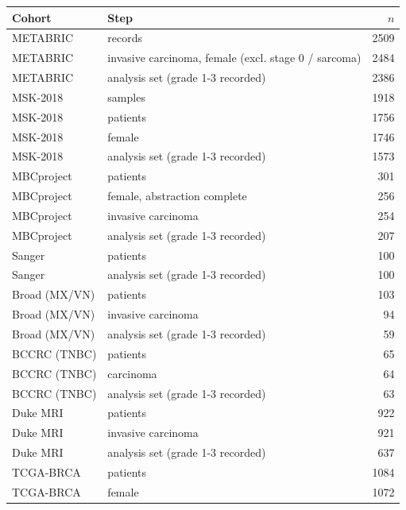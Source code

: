 \begin{tabular}{llr}
\toprule
Cohort & Step & $n$ \\
\midrule
METABRIC & records & 2509 \\
METABRIC & invasive carcinoma, female (excl. stage 0 / sarcoma) & 2484 \\
METABRIC & analysis set (grade 1-3 recorded) & 2386 \\
MSK-2018 & samples & 1918 \\
MSK-2018 & patients & 1756 \\
MSK-2018 & female & 1746 \\
MSK-2018 & analysis set (grade 1-3 recorded) & 1573 \\
MBCproject & patients & 301 \\
MBCproject & female, abstraction complete & 256 \\
MBCproject & invasive carcinoma & 254 \\
MBCproject & analysis set (grade 1-3 recorded) & 207 \\
Sanger & patients & 100 \\
Sanger & analysis set (grade 1-3 recorded) & 100 \\
Broad (MX/VN) & patients & 103 \\
Broad (MX/VN) & invasive carcinoma & 94 \\
Broad (MX/VN) & analysis set (grade 1-3 recorded) & 59 \\
BCCRC (TNBC) & patients & 65 \\
BCCRC (TNBC) & carcinoma & 64 \\
BCCRC (TNBC) & analysis set (grade 1-3 recorded) & 63 \\
Duke MRI & patients & 922 \\
Duke MRI & invasive carcinoma & 921 \\
Duke MRI & analysis set (grade 1-3 recorded) & 637 \\
TCGA-BRCA & patients & 1084 \\
TCGA-BRCA & female & 1072 \\
\bottomrule
\end{tabular}